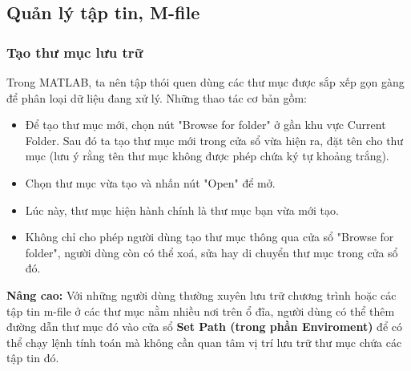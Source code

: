 \documentclass[12pt,a4paper]{article}
\begin{document}
\subsection{Quản lý tập tin, M-file}
\subsubsection{Tạo thư mục lưu trữ}
Trong MATLAB, ta nên tập thói quen dùng các thư mục được sắp xếp gọn gàng để phân loại dữ liệu đang xử lý. Những thao tác cơ bản gồm:
\begin{itemize}
	\item Để tạo thư mục mới, chọn nút "Browse for folder" ở gần khu vực Current Folder. Sau đó ta tạo thư mục mới trong cửa sổ vừa hiện ra, đặt tên cho thư mục (lưu ý rằng tên thư mục không được phép chứa ký tự khoảng trắng).
	\item Chọn thư mục vừa tạo và nhấn nút "Open" để mở.
	\item Lúc này, thư mục hiện hành chính là thư mục bạn vừa mới tạo.
	\item Không chỉ cho phép người dùng tạo thư mục thông qua cửa sổ "Browse for folder", người dùng còn có thể xoá, sửa hay di chuyển thư mục trong cửa sổ đó.
\end{itemize}
\textbf{Nâng cao:} Với những người dùng thường xuyên lưu trữ chương trình hoặc các tập tin m-file ở các thư mục nằm nhiều nơi trên ổ đĩa, người dùng có thể thêm đường dẫn thư mục đó vào cửa sổ \textbf{Set Path (trong phần Enviroment)} để có thể chạy lệnh tính toán mà không cần quan tâm vị trí lưu trữ thư mục chứa các tập tin đó.
\end{document}
